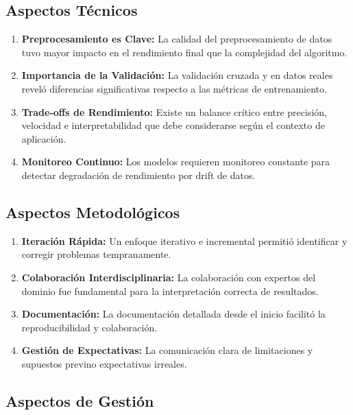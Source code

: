 \subsection{Aspectos Técnicos}

\begin{enumerate}
    \item \textbf{Preprocesamiento es Clave:} La calidad del preprocesamiento de datos tuvo mayor impacto en el rendimiento final que la complejidad del algoritmo.
    
    \item \textbf{Importancia de la Validación:} La validación cruzada y en datos reales reveló diferencias significativas respecto a las métricas de entrenamiento.
    
    \item \textbf{Trade-offs de Rendimiento:} Existe un balance crítico entre precisión, velocidad e interpretabilidad que debe considerarse según el contexto de aplicación.
    
    \item \textbf{Monitoreo Continuo:} Los modelos requieren monitoreo constante para detectar degradación de rendimiento por drift de datos.
\end{enumerate}

\subsection{Aspectos Metodológicos}

\begin{enumerate}
    \item \textbf{Iteración Rápida:} Un enfoque iterativo e incremental permitió identificar y corregir problemas tempranamente.
    
    \item \textbf{Colaboración Interdisciplinaria:} La colaboración con expertos del dominio fue fundamental para la interpretación correcta de resultados.
    
    \item \textbf{Documentación:} La documentación detallada desde el inicio facilitó la reproducibilidad y colaboración.
    
    \item \textbf{Gestión de Expectativas:} La comunicación clara de limitaciones y supuestos previno expectativas irreales.
\end{enumerate}

\subsection{Aspectos de Gestión}

